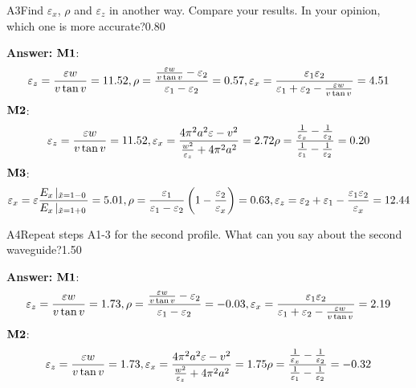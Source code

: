 \documentclass[11pt,a4paper]{article}
\begin{document}
\begin{solcard}{A3}{Find $\varepsilon_x$, $\rho$ and $\varepsilon_z$ in another way. Compare your results. In your opinion, which one is more accurate?}{0.80}
\par\smallskip\noindent\textbf{Answer:} $\bf M1$:\[\varepsilon_z=\frac{\varepsilon w}{v\tan v}=11.52,\\\rho=\frac{\frac{\varepsilon w}{v\tan v}-\varepsilon_2}{\varepsilon_1-\varepsilon_2}=0.57,\\\varepsilon_x=\frac{\varepsilon_1\varepsilon_2}{\varepsilon_1+\varepsilon_2-\frac{\varepsilon w}{v\tan v}}=4.51\] $\bf M2$:\[\varepsilon_z=\frac{\varepsilon w}{v\tan v}=11.52,\\\varepsilon_x=\frac{4\pi^2a^2\varepsilon-v^2}{\frac{w^2}{\varepsilon_z}+4\pi^2a^2}=2.72\\\rho=\frac{\frac1{\varepsilon_x}-\frac1{\varepsilon_2}}{\frac1{\varepsilon_1}-\frac1{\varepsilon_2}}=0.20\] $\bf M3$:\[\varepsilon_x=\varepsilon\frac{E_x\left\vert_{\tilde x=1-0}\right.}{E_x\left\vert_{\tilde x=1+0}\right.}=5.01,\\\rho=\frac{\varepsilon_1}{\varepsilon_1-\varepsilon_2}\left(1-\frac{\varepsilon_2}{\varepsilon_x}\right)=0.63,\\\varepsilon_z=\varepsilon_2+\varepsilon_1-\frac{\varepsilon_1\varepsilon_2}{\varepsilon_x}=12.44\]
\end{solcard}

\begin{solcard}{A4}{Repeat steps A1-3 for the second profile. What can you say about the second waveguide?}{1.50}
\par\smallskip\noindent\textbf{Answer:} $\bf M1$:\[\varepsilon_z=\frac{\varepsilon w}{v\tan v}=1.73,\\\rho=\frac{\frac{\varepsilon w}{v\tan v}-\varepsilon_2}{\varepsilon_1-\varepsilon_2}=-0.03,\\\varepsilon_x=\frac{\varepsilon_1\varepsilon_2}{\varepsilon_1+\varepsilon_2-\frac{\varepsilon w}{v\tan v}}=2.19\] $\bf M2$:\[\varepsilon_z=\frac{\varepsilon w}{v\tan v}=1.73,\\\varepsilon_x=\frac{4\pi^2a^2\varepsilon-v^2}{\frac{w^2}{\varepsilon_z}+4\pi^2a^2}=1.75\\\rho=\frac{\frac1{\varepsilon_x}-\frac1{\varepsilon_2}}{\frac1{\varepsilon_1}-\frac1{\varepsilon_2}}=-0.32\]
\end{solcard}
\end{document}
